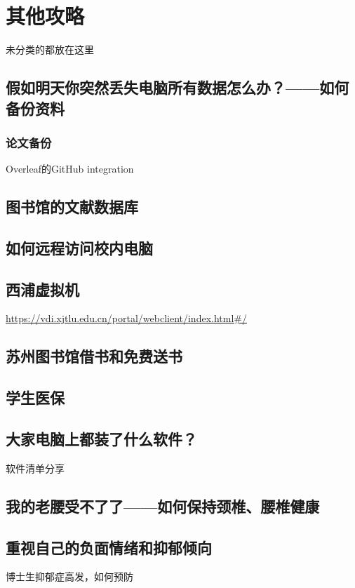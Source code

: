 
\chapter{其他攻略}

未分类的都放在这里

\section{假如明天你突然丢失电脑所有数据怎么办？——如何备份资料}
\subsection{论文备份}
Overleaf的GitHub integration
\section{图书馆的文献数据库}
\section{如何远程访问校内电脑}
\section{西浦虚拟机}
\url{https://vdi.xjtlu.edu.cn/portal/webclient/index.html#/}
\section{苏州图书馆借书和免费送书}
\section{学生医保}
\section{大家电脑上都装了什么软件？}
软件清单分享
\section{我的老腰受不了了——如何保持颈椎、腰椎健康}
\section{重视自己的负面情绪和抑郁倾向}
博士生抑郁症高发，如何预防
